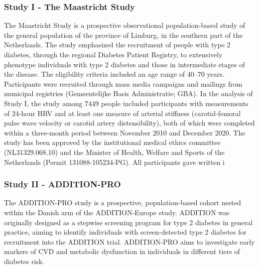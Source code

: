 \documentclass[
  a4paper,
  headsepline=true,
  open=any]{scrbook}
\begin{document}
\hypertarget{study-i---the-maastricht-study}{%
\subsubsection{Study I - The Maastricht
Study}\label{study-i---the-maastricht-study}}

The Maastricht Study is a prospective observational population-based
study of the general population of the province of Limburg, in the
southern part of the Netherlands. The study emphasized the recruitment
of people with type 2 diabetes, through the regional Diabetes Patient
Registry, to extensively phenotype individuals with type 2 diabetes and
those in intermediate stages of the disease. The eligibility criteria
included an age range of 40--70 years. Participants were recruited
through mass media campaigns and mailings from municipal registries
(Gemeentelijke Basis Administratie; GBA). In the analysis of Study I,
the study among 7449 people included participants with measurements of
24-hour HRV and at least one measure of arterial stiffness
(carotid-femoral pulse wave velocity or carotid artery distensibility),
both of which were completed within a three-month period between
November 2010 and December 2020. The study has been approved by the
institutional medical ethics committee (NL31329.068.10) and the Minister
of Health, Welfare and Sports of the Netherlands (Permit
131088-105234-PG). All participants gave written i

\hypertarget{study-ii---addition-pro}{%
\subsubsection{Study II - ADDITION-PRO}\label{study-ii---addition-pro}}

The ADDITION-PRO study is a prospective, population-based cohort nested
within the Danish arm of the ADDITION-Europe study. ADDITION was
originally designed as a stepwise screening program for type 2 diabetes
in general practice, aiming to identify individuals with screen-detected
type 2 diabetes for recruitment into the ADDITION trial. ADDITION-PRO
aims to investigate early markers of CVD and metabolic dysfunction in
individuals in different tiers of diabetes risk.
\end{document}
